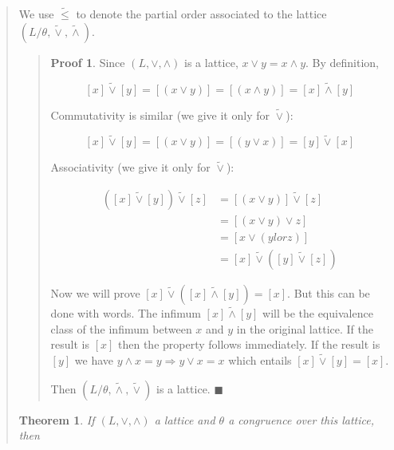 \documentclass[a4paper, 12pt]{article}
\newtheorem{theorem}{Theorem}
\theoremstyle{definition}
\theoremstyle{definition}
\theoremstyle{definition}
\newtheorem{pro}{Proof}
\begin{document}
\begin{quote}
We use $\widetilde{ \leq } $ to denote the partial order associated to the
lattice $(L / \theta, \widetilde{ \lor  }, \widetilde{ \land  }  )$.


\small
\begin{quote}
\begin{pro}
    
    Since $(L, \lor , \land )$ is a lattice, $x \lor   y = x \land  y $. By definition, 

    $$[x] \widetilde{ \lor  } [y] =  [ (x \lor y) ] = [(x \land  y)] = [x] \widetilde{ \land  } [y] $$

    Commutativity is similar (we give it only for $\widetilde{ \lor  } $):

    $$[x] \widetilde{ \lor  } [y] = [ (x \lor y) ] = [( y \lor  x )] = [y] \widetilde{ \lor  } [x]$$

    Associativity (we give it only for $\widetilde{ \lor  }  $):

    \begin{align*}
        ( [x] \widetilde{ \lor } [y] ) \widetilde{ \lor  } [z] &= \left[ \left( x \lor y \right)  \right] \widetilde{ \lor  } [z] \\ 
                                                               &= \left[ (x \lor y) \lor  z \right] \\ 
                                                               &=\left[ x \lor (y lor z) \right] \\ 
                                                               &= [x] \widetilde{ \lor  } \left( [y] \widetilde{ \lor  }  [z]\right) 
    \end{align*}

    Now we will prove $[x] \widetilde{ \lor  } ([x] \widetilde{ \land   } [y])
    = [x]$. But this can be done with words. The infimum $[x] \widetilde{ \land
    } [y] $ will be the equivalence class of the infimum between $x$ and $y$ in
    the original lattice. If the result is $[x]$ then the property follows
    immediately. If the result is $[y]$ we have $y \land  x = y \Rightarrow y
    \lor x = x$ which entails $[x] \widetilde{ \lor  }   [y] = [x]$. 

    Then $(L/\theta, \widetilde{ \land  }, \widetilde{  \lor   })$ is a
    lattice. $\blacksquare$


\end{pro}

\end{quote}
\normalsize


\begin{theorem}
    If $(L, \lor , \land )$ a lattice and $\theta$ a congruence over this
    lattice, then 


\end{theorem}
\end{quote}
\end{document}
